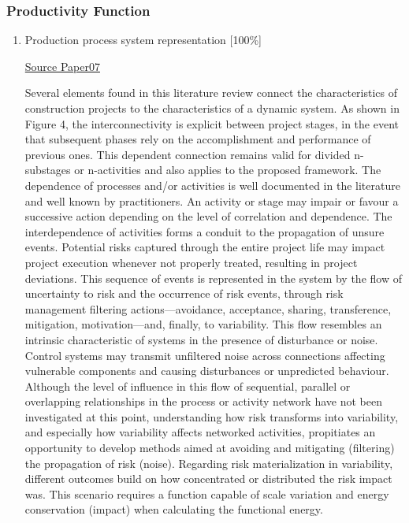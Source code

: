 \documentclass{article}
\begin{document}
\subsubsection{Productivity Function}
\label{sec:org03d5d96}
\begin{enumerate}
\item Production process system representation [100\%]
\label{sec:org6d785a8}

\uline{Source Paper07}

Several elements found in this literature review connect the characteristics of construction projects to the characteristics of a dynamic system.
As shown in Figure 4, the interconnectivity is explicit between project stages, in the event that subsequent phases rely on the accomplishment and performance of previous ones.
This dependent connection remains valid for divided n-substages or n-activities and also applies to the proposed framework.
The dependence of processes and/or activities is well documented in the literature and well known by practitioners.
An activity or stage may impair or favour a successive action depending on the level of correlation and dependence.
The interdependence of activities forms a conduit to the propagation of unsure events. Potential risks captured through the entire project life may impact project execution whenever not properly treated, resulting in project deviations.
This sequence of events is represented in the system by the flow of uncertainty to risk and the occurrence of risk events, through risk management filtering actions—avoidance, acceptance, sharing, transference, mitigation, motivation—and, finally, to variability.
This flow resembles an intrinsic characteristic of systems in the presence of disturbance or noise.
Control systems may transmit unfiltered noise across connections affecting vulnerable components and causing disturbances or unpredicted behaviour.
Although the level of influence in this flow of sequential, parallel or overlapping relationships in the process or activity network have not been investigated at this point, understanding how risk transforms into variability, and especially how variability affects networked activities, propitiates an opportunity to develop methods aimed at avoiding and mitigating (filtering) the propagation of risk (noise). Regarding risk materialization in variability, different outcomes build on how concentrated or distributed the risk impact was.
This scenario requires a function capable of scale variation and energy conservation (impact) when calculating the functional energy.

\end{enumerate}
\end{document}
